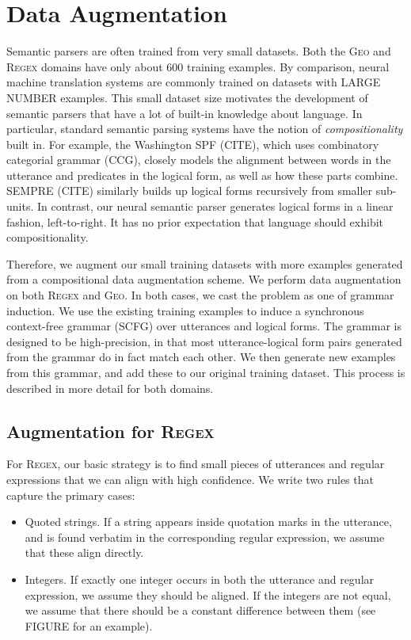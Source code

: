 \documentclass[11pt,letterpaper]{article}
\newcommand{\regex}{\textsc{Regex}\xspace}
\newcommand{\geo}{\textsc{Geo}\xspace}
\begin{document}
\section{Data Augmentation}
Semantic parsers are often trained from very small datasets.
Both the \geo and \regex domains have only about $600$ training examples.
By comparison, neural machine translation systems are commonly
trained on datasets with LARGE NUMBER examples.
This small dataset size motivates the development of semantic parsers
that have a lot of built-in knowledge about language.
In particular, standard semantic parsing systems have
the notion of \emph{compositionality} built in.
For example, the Washington SPF (CITE), 
which uses combinatory categorial grammar (CCG),
closely models the alignment between words in the utterance 
and predicates in the logical form, as well as how these parts
combine.  SEMPRE (CITE) similarly builds up logical forms
recursively from smaller sub-units.  In contrast,
our neural semantic parser generates logical forms in a linear fashion,
left-to-right.  It has no prior expectation that language should
exhibit compositionality.

Therefore, we augment our small training datasets with 
more examples generated from a compositional data augmentation scheme.
We perform data augmentation on both \regex and \geo.
In both cases, we cast the problem as one of grammar induction.
We use the existing training examples to induce a
synchronous context-free grammar (SCFG) over utterances and logical forms.
The grammar is designed to be high-precision, 
in that most utterance-logical form pairs generated from the grammar
do in fact match each other.
We then generate new examples from this grammar,
and add these to our original training dataset.
This process is described in more detail for both domains.

\subsection{Augmentation for \regex}
For \regex, our basic strategy is to find small pieces of 
utterances and regular expressions that we can align with high confidence.
We write two rules that capture the primary cases:
\begin{itemize}
  \item Quoted strings.  If a string appears inside quotation marks
    in the utterance, and is found verbatim in the corresponding
    regular expression, we assume that these align directly.
  \item Integers.  If exactly one integer occurs in both the 
    utterance and regular expression, we assume they should be aligned.
    If the integers are not equal, we assume that there should be
    a constant difference between them (see FIGURE for an example).
\end{itemize}
\end{document}
